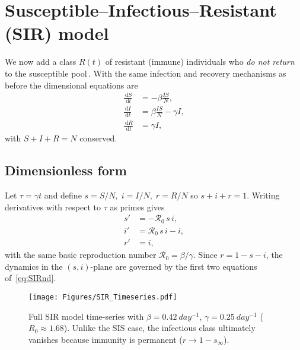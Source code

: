 \documentclass[11pt]{article}
\newcommand{\dd}{\,\mathrm{d}}
\newcommand{\RR}{\mathcal{R}_0}
\begin{document}
\section{Susceptible–Infectious–Resistant (SIR) model}
\label{sec:SIR}

We now add a class $R(t)$ of resistant (immune) individuals who
\emph{do not return} to the susceptible pool\,\citep{Kermack1927}.  
With the same infection and recovery mechanisms as before
the dimensional equations are
\begin{align*}
\frac{\dd S}{\dd t} &= -\beta \frac{I S}{N} ,          \\
\frac{\dd I}{\dd t} &=  \beta \frac{I S}{N}-\gamma I, \\
\frac{\dd R}{\dd t} &= \gamma I,
\end{align*}
with $S+I+R=N$ conserved.

\subsection*{Dimensionless form}
Let $\tau=\gamma t$ and define
\(s=S/N,\; i=I/N,\; r=R/N\) so $s+i+r=1$.
Writing derivatives with respect to $\tau$ as primes gives
\begin{subequations}\label{eq:SIRnd}
\begin{align}
s' &= -\RR\,s\,i,          \\
i' &=  \RR\,s\,i-i,        \\
r' &= i,
\end{align}
\end{subequations}
with the same basic reproduction number
\(\RR=\beta/\gamma\).
Since $r=1-s-i$, the dynamics in the
\((s,i)\)-plane are governed by the first two equations of~\cref{eq:SIRnd}.

\begin{figure}[H]
  \centering
  \texttt{[image: Figures/SIR\_Timeseries.pdf]}
  \caption{Full SIR model time-series with
           $\beta=\SI{0.42}{day^{-1}}$, $\gamma=\SI{0.25}{day^{-1}}$
           ($R_0\approx1.68$).  Unlike the SIS case, the infectious class
           ultimately vanishes because immunity is permanent ($r\to1-s_\infty$).}
  \label{fig:sir_timeseries}
\end{figure}
\end{document}
